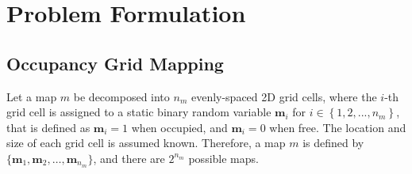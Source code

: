 \documentclass[letterpaper, 10pt, conference]{ieeeconf}
\newcommand{\braces}[1]{\ensuremath{\left\{ #1 \right\}}}
\begin{document}



\section{Problem Formulation}

\subsection{Occupancy Grid Mapping}

Let a map $m$ be decomposed into $n_m$ evenly-spaced 2D grid cells, where the $i$-th grid cell is assigned to a static binary random variable $\mathbf{m}_i$ for $i\in\braces{1,2,...,n_m}$, that is defined as $\mathbf{m}_i=1$ when occupied, and $\mathbf{m}_i=0$ when free. The location and size of each grid cell is assumed known. Therefore, a map $m$ is defined by $\{\mathbf{m}_1,\mathbf{m}_2,\ldots, \mathbf{m}_{n_m}\}$, and there are $2^{n_{m}}$ possible maps. 
\end{document}
